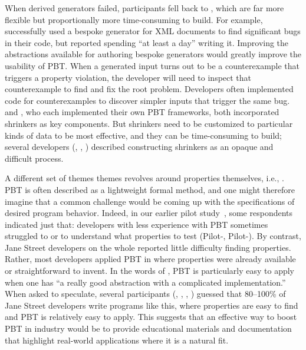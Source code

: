 When derived generators
failed, participants fell back to , which
are far more flexible but proportionally more time-consuming to
build. For example,  successfully used a bespoke
generator for XML documents to find significant bugs in their code,
but reported spending ``at least a day'' writing it.
Improving the abstractions available for authoring bespoke generators would
greatly improve the usability of PBT.
%
When a generated input turns out to be a counterexample that triggers
a property violation, the developer will need to inspect that
counterexample to find
and fix the root problem. Developers often implemented code for
 counterexamples to discover
simpler inputs that trigger the same bug.  
and , who each implemented their own PBT frameworks, both
incorporated shrinkers as key components. But
shrinkers need to be customized to particular kinds of data to be most
effective, and they can be time-consuming to build; several
developers
(,  , )
described constructing shrinkers as an opaque and difficult process.

A different set of themes
themes revolves around properties themselves, i.e.,
.
PBT is often described as a lightweight formal method, and one
might therefore imagine that a common challenge would be coming up with the
specifications of desired program behavior. Indeed, in our earlier pilot
study~\cite{goldstein_problems_2022}, some respondents indicated just that:
developers with less experience with PBT
sometimes struggled to  or to understand what properties to test (Pilot-,
Pilot-).
By contrast, Jane Street developers on the whole reported
little difficulty finding
properties. Rather, most developers applied PBT in
 where properties were already
available or straightforward to invent. In the words of
, PBT is particularly easy to apply
when
one has ``a really good abstraction with a complicated implementation.''
When asked to speculate, several participants (, ,
, ) guessed
that 80--100\% of Jane Street
developers write programs like this,
where properties are easy to find and
PBT is relatively easy to apply. This suggests that an effective way to
boost PBT in industry would be to provide
educational materials and documentation that highlight
real-world applications where it is a natural
fit.

